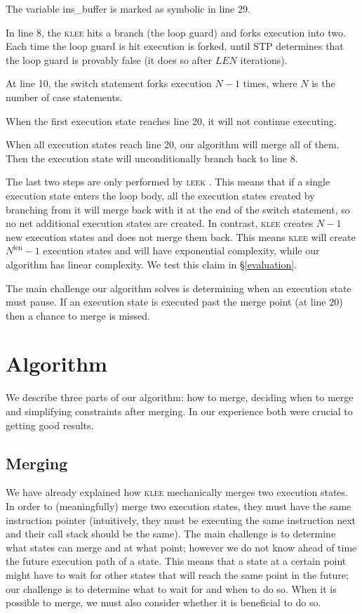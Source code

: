 \documentclass[12pt,a4paper]{article}
\newcommand{\klee}{\textsc{klee }}
\newcommand{\leek}{\textsc{leek }}
\begin{document}
\begin{enumerate*}
\item The variable ins\_buffer is marked as symbolic in line 29.
\item In line 8, the \klee hits a branch (the loop guard) and forks execution into two. Each time the loop guard is hit execution is forked, until STP determines that the loop guard is provably false (it does so after $LEN$ iterations).
\item At line 10, the switch statement forks execution $N-1$ times, where $N$ is the number of case statements.
\item When the first execution state reaches line 20, it will not continue executing.
\item When all execution states reach line 20, our algorithm will merge all of them. Then the execution state will unconditionally branch back to line 8.
\end{enumerate*}

The last two steps are only performed by \leek. This means that if a single execution state enters the loop body, all the execution states created by branching from it will merge back with it at the end of the switch statement, so no net additional execution states are created. In contrast, \klee creates $N-1$ new execution states and does not merge them back. This means \klee will create $N^\text{len} - 1$ execution states and will have exponential complexity, while our algorithm has linear complexity. We test this claim in \S\ref{evaluation}.

The main challenge our algorithm solves is determining when an execution state must pause. If an execution state is executed past the merge point (at line 20) then a chance to merge is missed.

\section{Algorithm}\label{algorithm}
We describe three parts of our algorithm: how to merge, deciding when to merge and simplifying constraints after merging. In our experience both were crucial to getting good results.

\subsection{Merging}

We have already explained how \klee mechanically merges two execution states. In order to (meaningfully) merge two execution states, they must have the same instruction pointer (intuitively, they must be executing the same instruction next and their call stack should be the same). The main challenge is to determine what states can merge and at what point; however we do not know ahead of time the future execution path of a state. This means that a state at a certain point might have to wait for other states that will reach the same point in the future; our challenge is to determine what to wait for and when to do so. When it is possible to merge, we must also consider whether it is beneficial to do so.
\end{document}
